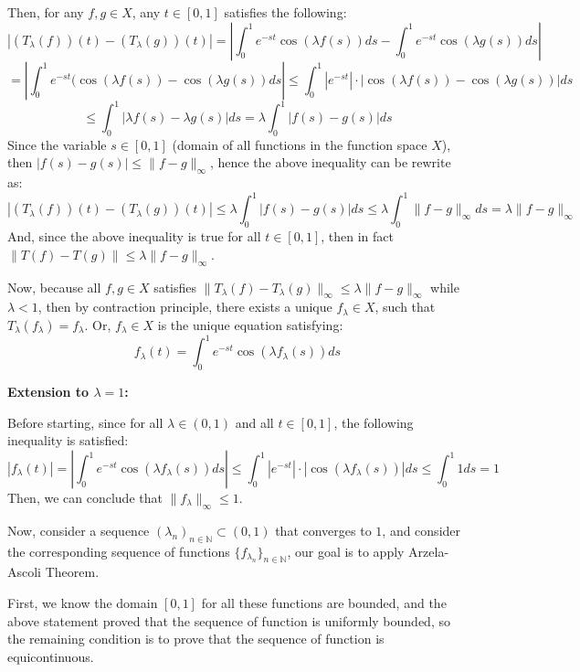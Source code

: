 \documentclass{article}
\begin{document}
Then, for any $f,g\in X$, any $t\in [0,1]$ satisfies the following:
$$|(T_\lambda(f))(t)-(T_\lambda(g))(t)| = \left|\int_{0}^{1}e^{-st}\cos(\lambda f(s))ds-\int_{0}^{1}e^{-st}\cos(\lambda g(s))ds\right|$$
$$ = \left|\int_{0}^{1}e^{-st}(\cos(\lambda f(s))-\cos(\lambda g(s))ds\right| \leq \int_{0}^{1}|e^{-st}|\cdot |\cos(\lambda f(s))-\cos(\lambda g(s))|ds$$
$$\leq \int_{0}^{1}|\lambda f(s)-\lambda g(s)|ds = \lambda \int_{0}^{1}|f(s)-g(s)|ds$$
Since the variable $s\in [0,1]$ (domain of all functions in the function space $X$), then $|f(s)-g(s)| \leq \|f-g\|_\infty$, hence the above inequality can be rewrite as:
$$|(T_\lambda(f))(t)-(T_\lambda(g))(t)| \leq \lambda\int_{0}^{1}|f(s)-g(s)|ds \leq \lambda\int_{0}^{1}\|f-g\|_\infty ds = \lambda\|f-g\|_\infty$$
And, since the above inequality is true for all $t\in [0,1]$, then in fact $\|T(f)-T(g)\| \leq \lambda \|f-g\|_\infty$.

Now, because all $f,g\in X$ satisfies $\|T_\lambda(f)-T_\lambda(g)\|_\infty \leq \lambda\|f-g\|_\infty$ while $\lambda<1$, then by contraction principle, there exists a unique $f_\lambda \in X$,
such that $T_\lambda(f_\lambda)=f_\lambda$. Or, $f_\lambda\in X$ is the unique equation satisfying:
$$f_\lambda(t)=\int_{0}^{1}e^{-st}\cos(\lambda f_\lambda(s))ds$$

\hfil

\textbf{Extension to $\lambda=1$:}

Before starting, since for all $\lambda\in (0,1)$ and all $t\in [0,1]$, the following inequality is satisfied:
$$|f_\lambda(t)| = \left|\int_{0}^{1}e^{-st}\cos(\lambda f_\lambda(s))ds\right|\leq\int_{0}^{1}|e^{-st}|\cdot |\cos(\lambda f_\lambda(s))|ds \leq \int_{0}^{1}1 ds = 1$$
Then, we can conclude that $\|f_\lambda\|_\infty \leq 1$.

\hfil

Now, consider a sequence $(\lambda_n)_{n\in\mathbb{N}}\subset (0,1)$ that converges to $1$, and consider the corresponding sequence of functions $\{f_{\lambda_n}\}_{n\in\mathbb{N}}$,
our goal is to apply Arzela-Ascoli Theorem.

First, we know the domain $[0,1]$ for all these functions are bounded, and the above statement proved that the sequence of function is uniformly bounded, so the remaining condition is to prove that the sequence of function is equicontinuous.
\end{document}
